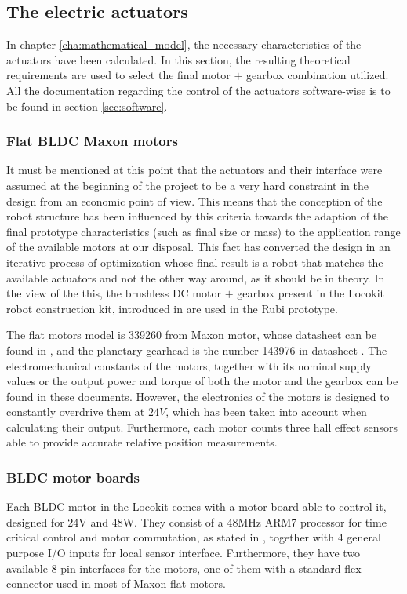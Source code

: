 
\subsection{The electric actuators} %
\label{sub:electric_actuators}
In chapter \ref{cha:mathematical_model}, the necessary characteristics of the actuators have been calculated.
In this section, the resulting theoretical requirements are used to select the final motor $+$ gearbox combination utilized.
All the documentation regarding the control of the actuators software-wise is to be found in section \ref{sec:software}.

\subsubsection{Flat BLDC Maxon motors} %
\label{ssub:the_bldc_motors}
It must be mentioned at this point that the actuators and their interface were assumed at the beginning of the project to be a very hard constraint in the design from an economic point of view. 
This means that the conception of the robot structure has been influenced by this criteria towards the adaption of the final prototype characteristics (such as final size or mass) to the application range of the available motors at our disposal.
This fact has converted the design in an iterative process of optimization whose final result is a robot that matches the available actuators and not the other way around, as it should be in theory.
In the view of the this, the brushless DC motor $+$ gearbox present in the Locokit robot construction kit, introduced in \cite{locokit} are used in the Rubi prototype.

The flat motors model is 339260 from Maxon motor, whose datasheet can be found in \cite{maxon_motor}, and the planetary gearhead is the number 143976 in datasheet \cite{maxon_gear}.
The electromechanical constants of the motors, together with its nominal supply values or the output power and torque of both the motor and the gearbox can be found in these documents. 
However, the electronics of the motors is designed to constantly overdrive them at $24V$, which has been taken into account when calculating their output.
Furthermore, each motor counts three hall effect sensors able to provide accurate relative position measurements.



\subsubsection{BLDC motor boards} %
\label{ssub:bldc_motor_boards}
Each BLDC motor in the Locokit comes with a motor board able to control it, designed for 24V and 48W.
They consist of a 48MHz ARM7 processor for time critical control and motor commutation, as stated in \cite{locokit-electronics}, together with 4 general purpose I/O inputs for local sensor interface.
Furthermore, they have two available 8-pin interfaces for the motors, one of them with a standard flex connector used in most of Maxon flat motors.

